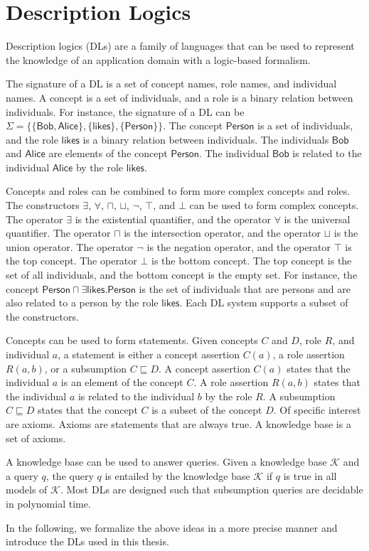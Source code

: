 

%
\chapter*{\thechapter \quad Description Logics}
\label{appendixA}

Description logics (DLs) are a family of languages 
that can be used to represent the knowledge of 
an application domain with a logic-based formalism.

The signature of a DL is a set of concept names, role names, and individual names.
A concept is a set of individuals, and a role is a binary relation between individuals.
For instance, the signature of a DL can be $\Sigma = \{\{\mathsf{Bob}, \mathsf{Alice}\}, \{\mathsf{likes}\}, \{\mathsf{Person}\}\}$.
The concept $\mathsf{Person}$ is a set of individuals, and the role $\mathsf{likes}$ is a binary relation between individuals.
The individuals $\mathsf{Bob}$ and $\mathsf{Alice}$ are elements of the concept $\mathsf{Person}$.
The individual $\mathsf{Bob}$ is related to the individual $\mathsf{Alice}$ by the role $\mathsf{likes}$.

Concepts and roles can be combined to form more complex concepts and roles.
The constructors $\exists$, $\forall$, $\sqcap$, $\sqcup$, $\neg$, $\top$, and $\bot$ can be used to form complex concepts.
The operator $\exists$ is the existential quantifier, and the operator $\forall$ is the universal quantifier.
The operator $\sqcap$ is the intersection operator, and the operator $\sqcup$ is the union operator.
The operator $\neg$ is the negation operator, and the operator $\top$ is the top concept.
The operator $\bot$ is the bottom concept.
The top concept is the set of all individuals, and the bottom concept is the empty set.
For instance, the concept $\mathsf{Person} \sqcap \exists \mathsf{likes}.\mathsf{Person}$ is the set of individuals that are persons and
are also related to a person by the role $\mathsf{likes}$.
Each DL system supports a subset of the constructors.

Concepts can be used to form statements.
Given concepts $C$ and $D$, role $R$, and individual $a$,
a statement is either a concept assertion $C(a)$, a role assertion $R(a, b)$, or a subsumption $C \sqsubseteq D$.
A concept assertion $C(a)$ states that the individual $a$ is an element of the concept $C$.
A role assertion $R(a, b)$ states that the individual $a$ is related to the individual $b$ by the role $R$.
A subsumption $C \sqsubseteq D$ states that the concept $C$ is a subset of the concept $D$.
Of specific interest are axioms.
Axioms are statements that are always true.
A knowledge base is a set of axioms.

A knowledge base can be used to answer queries.
Given a knowledge base $\mathcal{K}$ and a query $q$,
the query $q$ is entailed by the knowledge base $\mathcal{K}$ if $q$ is true in all models of $\mathcal{K}$.
Most DLs are designed such that subsumption queries are decidable in polynomial time.

In the following, we formalize the above ideas in a more precise manner
and introduce the DLs used in this thesis.

